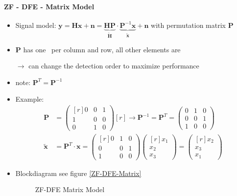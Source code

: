 \documentclass[a4paper, 10pt]{article}
\begin{document}
\paragraph{ZF - DFE - Matrix Model}
\begin{itemize}
	\item Signal model: $ \mathbf{y} = \mathbf{Hx} + \mathbf{n} = \underbrace{\mathbf{HP}}_{\tilde{\mathbf{H}}}\cdot\underbrace{\mathbf{P}^{-1}\mathbf{x}}_{\tilde{\mathbf{x}}} + \mathbf{n} $ with permutation matrix $\mathbf{P} $
	\item $\mathbf{P} $ has one \grqq\, per column and row, all other elements are \grqq 
	\item[$\rightarrow$] can change the detection order to maximize performance
	\item note: $\mathbf{P}^T = \mathbf{P}^{-1} $
	\item Example: 
	\begin{align*}
		\mathbf{P} &= \begin{pmatrix*}[r] 0 & 0 & 1\\1 & 0 & 0\\ 0 & 1 & 0	\end{pmatrix*}[r] \rightarrow \mathbf{P}^{-1} = \mathbf{P}^T = \begin{pmatrix*}0 & 1 & 0\\0 & 0 & 1\\ 1 & 0 & 0\end{pmatrix*}\\
		\tilde{\mathbf{x}} &= \mathbf{P}^T\cdot\mathbf{x} = \begin{pmatrix*}[r] 0 & 1 & 0\\ 0 & 0 & 1\\ 1 & 0 & 0\end{pmatrix*}\begin{pmatrix*}[r]x_1 \\x_2\\x_3\end{pmatrix*} = \begin{pmatrix*}[r]x_2\\x_3\\x_1\end{pmatrix*}
	\end{align*}
	\item Blockdiagram see figure \ref{ZF-DFE-Matrix}
	\begin{figure}
		\centering
		\resizebox{\textwidth}{!}{}
		\caption{ZF-DFE Matrix Model}
		\label{fig:ZF-DFE-Matrix_pstex_t}
	\end{figure}

\end{itemize}
\end{document}
